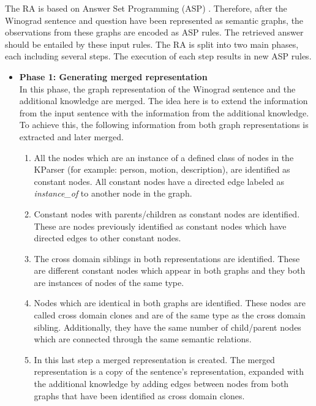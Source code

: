 The RA is based on Answer Set Programming (ASP) \cite{DBLP:conf/aaai/Lifschitz08}. Therefore, after the Winograd sentence and question have been represented as semantic graphs, the observations from these graphs are encoded as ASP rules. The retrieved answer should be entailed by these input rules.
The RA is split into two main phases, each including several steps. The execution of each step results in new ASP rules. 
\begin{itemize}
	\item \textbf{Phase 1: Generating merged representation}\\
	 In this phase, the graph representation of the Winograd sentence and the additional knowledge are merged. The idea here is to extend the information from the input sentence with the information from the additional knowledge. To achieve this, the following information from both graph representations is extracted and later merged.
	\begin{enumerate}
		\item All the nodes which are an instance of a defined class of nodes in the KParser (for example: person, motion, description), are identified as constant nodes. All constant nodes have a directed edge labeled as \textit{instance\_of} to another node in the graph. 
		\item Constant nodes with parents/children as constant nodes are identified. These are nodes previously identified as constant nodes which have directed edges to other constant nodes.
		\item The cross domain siblings in both representations are identified. These are different constant nodes which appear in both graphs and they both are instances of nodes of the same type. 
		\item Nodes which are identical in both graphs are identified. These nodes are called cross domain clones and are of the same type as the cross domain sibling. Additionally, they have the same number of child/parent nodes which are connected through the same semantic relations. 
		\item In this last step a merged representation is created. The merged representation is a copy of the sentence's representation, expanded with the additional knowledge by adding edges between nodes from both graphs that have been identified as cross domain clones.
	\end{enumerate}


\end{itemize}
